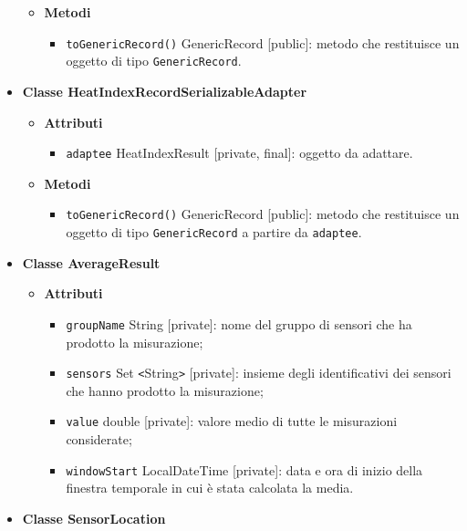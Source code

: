 \begin{itemize}
\begin{itemize}
		      \item \textbf{Metodi}
		            \begin{itemize}
			            \item \texttt{toGenericRecord()} GenericRecord [public]: metodo che restituisce un oggetto di tipo \texttt{GenericRecord}.
		            \end{itemize}
	      \end{itemize}
	\item \textbf{Classe HeatIndexRecordSerializableAdapter}
	      \begin{itemize}
		      \item \textbf{Attributi}
		            \begin{itemize}
			            \item \texttt{adaptee} HeatIndexResult [private, final]: oggetto da adattare.
		            \end{itemize}
		      \item \textbf{Metodi}
		            \begin{itemize}
			            \item \texttt{toGenericRecord()} GenericRecord [public]: metodo che restituisce un oggetto di tipo \texttt{GenericRecord} a partire da \texttt{adaptee}.
		            \end{itemize}
	      \end{itemize}
	\item \textbf{Classe AverageResult}
	      \begin{itemize}
		      \item \textbf{Attributi}
		            \begin{itemize}
			            \item \texttt{groupName} String [private]: nome del gruppo di sensori che ha prodotto la misurazione;
			            \item \texttt{sensors} Set \texttt{<}String\texttt{>} [private]: insieme degli identificativi dei sensori che hanno prodotto la misurazione;
			            \item \texttt{value} double [private]: valore medio di tutte le misurazioni considerate;
			            \item \texttt{windowStart} LocalDateTime [private]: data e ora di inizio della finestra temporale in cui è stata calcolata la media.
		            \end{itemize}
	      \end{itemize}
	\item \textbf{Classe SensorLocation}

\end{itemize}
